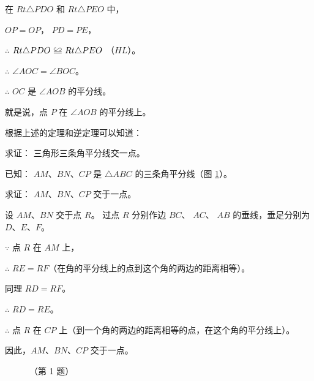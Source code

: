 在 $Rt \triangle PDO$ 和 $Rt \triangle PEO$ 中，

$OP = OP$， $PD = PE$，

$\therefore$ \quad $Rt \triangle PDO \quandeng Rt \triangle PEO$ （$HL$）。

$\therefore$ \quad $\angle AOC = \angle BOC$。

$\therefore$ \quad $OC$ 是 $\angle AOB$ 的平分线。

就是说，点 $P$ 在 $\angle AOB$ 的平分线上。

根据上述的定理和逆定理可以知道：

\liti[0] 求证： 三角形三条角平分线交一点。

已知： $AM$、$BN$、$CP$ 是 $\triangle ABC$ 的三条角平分线（图 \ref{fig:czjh1-3-59}）。

求证： $AM$、$BN$、$CP$ 交于一点。

\zhengming 设 $AM$、$BN$ 交于点 $R$。 过点 $R$ 分别作边 $BC$、 $AC$、 $AB$ 的垂线，垂足分别为 $D$、$E$、$F$。

$\because$ \quad 点 $R$ 在 $AM$ 上，

$\therefore$ \quad $RE = RF$（在角的平分线上的点到这个角的两边的距离相等）。

同理 \quad $RD = RF$。

$\therefore$ \quad $RD = RE$。

$\therefore$ \quad 点 $R$ 在 $CP$ 上（到一个角的两边的距离相等的点，在这个角的平分线上）。

因此，$AM$、$BN$、$CP$ 交于一点。

\begin{figure}[htbp]
    \centering
    \begin{minipage}[b]{7cm}
        \centering
        
        \caption{}\label{fig:czjh1-3-59}
    \end{minipage}
    \qquad
    \begin{minipage}[b]{7cm}
        \centering
        
        \caption*{（第 1 题）}
    \end{minipage}
\end{figure}

\begin{lianxi}



\end{lianxi}

